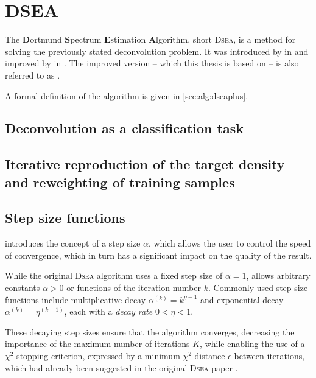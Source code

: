 \section{DSEA} %
The \textbf{D}ortmund \textbf{S}pectrum \textbf{E}stimation \textbf{A}lgorithm,
  short \textsc{Dsea},
is a method for solving the previously stated deconvolution problem.
It was introduced by \citeauthor{dsea_tim} in \citeyear{dsea_tim}
and improved by \citeauthor{dsea_mirko} in \citeyear{dsea_mirko}.
The improved version
  – which this thesis is based on –
is also referred to as \dseaplus.

A formal definition of the \dseaplus algorithm is given in \autoref{sec:alg:dseaplus}.


\subsection{Deconvolution as a classification task} %
\blindtext[2]


\subsection{Iterative reproduction of the target density and reweighting of training samples} %
\blindtext[5]


\subsection{Step size functions} \label{sec:dsea:dsea:stepsize}
\dseaplus introduces the concept of a step size $\alpha$,
which allows the user to control the speed of convergence,
which in turn has a significant impact on the quality of the result.

While the original \textsc{Dsea} algorithm uses a fixed step size of $\alpha = 1$,
\dseaplus allows arbitrary constants $\alpha > 0$
or functions of the iteration number $k$.
Commonly used step size functions include
multiplicative decay
  $\alpha^{(k)} = k^{\eta - 1}$
and exponential decay
  $\alpha^{(k)} = \eta^{(k - 1)}$,
each with a \emph{decay rate} $0 < \eta < 1$.

These decaying step sizes ensure that the algorithm converges,
decreasing the importance of the maximum number of iterations $K$,
while enabling the use of a $\chi^2$ stopping criterion,
  expressed by a minimum $\chi^2$ distance $\epsilon$ between iterations,
  which had already been suggested in the original \textsc{Dsea} paper \cite{dsea_tim}.



